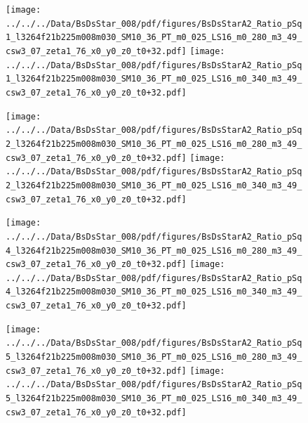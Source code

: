 \documentclass[a4paper,10pt]{article}
\begin{document}
\begin{figure}[p]
 \texttt{[image: ../../../Data/BsDsStar\_008/pdf/figures/BsDsStarA2\_Ratio\_pSq1\_l3264f21b225m008m030\_SM10\_36\_PT\_m0\_025\_LS16\_m0\_280\_m3\_49\_csw3\_07\_zeta1\_76\_x0\_y0\_z0\_t0+32.pdf]} 
 \texttt{[image: ../../../Data/BsDsStar\_008/pdf/figures/BsDsStarA2\_Ratio\_pSq1\_l3264f21b225m008m030\_SM10\_36\_PT\_m0\_025\_LS16\_m0\_340\_m3\_49\_csw3\_07\_zeta1\_76\_x0\_y0\_z0\_t0+32.pdf]} 
 \end{figure}
\begin{figure}[p]
 \texttt{[image: ../../../Data/BsDsStar\_008/pdf/figures/BsDsStarA2\_Ratio\_pSq2\_l3264f21b225m008m030\_SM10\_36\_PT\_m0\_025\_LS16\_m0\_280\_m3\_49\_csw3\_07\_zeta1\_76\_x0\_y0\_z0\_t0+32.pdf]} 
 \texttt{[image: ../../../Data/BsDsStar\_008/pdf/figures/BsDsStarA2\_Ratio\_pSq2\_l3264f21b225m008m030\_SM10\_36\_PT\_m0\_025\_LS16\_m0\_340\_m3\_49\_csw3\_07\_zeta1\_76\_x0\_y0\_z0\_t0+32.pdf]} 
 \end{figure}
\begin{figure}[p]
 \texttt{[image: ../../../Data/BsDsStar\_008/pdf/figures/BsDsStarA2\_Ratio\_pSq4\_l3264f21b225m008m030\_SM10\_36\_PT\_m0\_025\_LS16\_m0\_280\_m3\_49\_csw3\_07\_zeta1\_76\_x0\_y0\_z0\_t0+32.pdf]} 
 \texttt{[image: ../../../Data/BsDsStar\_008/pdf/figures/BsDsStarA2\_Ratio\_pSq4\_l3264f21b225m008m030\_SM10\_36\_PT\_m0\_025\_LS16\_m0\_340\_m3\_49\_csw3\_07\_zeta1\_76\_x0\_y0\_z0\_t0+32.pdf]} 
 \end{figure}
\clearpage
\begin{figure}[p]
 \texttt{[image: ../../../Data/BsDsStar\_008/pdf/figures/BsDsStarA2\_Ratio\_pSq5\_l3264f21b225m008m030\_SM10\_36\_PT\_m0\_025\_LS16\_m0\_280\_m3\_49\_csw3\_07\_zeta1\_76\_x0\_y0\_z0\_t0+32.pdf]} 
 \texttt{[image: ../../../Data/BsDsStar\_008/pdf/figures/BsDsStarA2\_Ratio\_pSq5\_l3264f21b225m008m030\_SM10\_36\_PT\_m0\_025\_LS16\_m0\_340\_m3\_49\_csw3\_07\_zeta1\_76\_x0\_y0\_z0\_t0+32.pdf]} 
 \end{figure}
\clearpage
\end{document}

